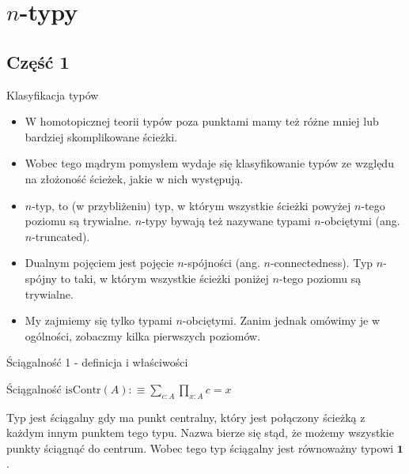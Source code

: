 \documentclass{beamer}
\newcommand{\defn}{:\equiv}
\newcommand{\isContr}{\text{isContr}}
\begin{document}
\section{$n$-typy}

\subsection{Część 1}

\begin{frame}{Klasyfikacja typów}
\begin{itemize}
	\item W homotopicznej teorii typów poza punktami mamy też różne mniej lub bardziej skomplikowane ścieżki.
	\item Wobec tego mądrym pomysłem wydaje się klasyfikowanie typów ze względu na złożoność ścieżek, jakie w nich występują.
	\item $n$-typ, to (w przybliżeniu) typ, w którym wszystkie ścieżki powyżej $n$-tego poziomu są trywialne. $n$-typy bywają też nazywane typami $n$-obciętymi (ang. $n$-truncated).
	\item Dualnym pojęciem jest pojęcie $n$-spójności (ang. $n$-connectedness). Typ $n$-spójny to taki, w którym wszystkie ścieżki poniżej $n$-tego poziomu są trywialne.
	\item My zajmiemy się tylko typami $n$-obciętymi. Zanim jednak omówimy je w ogólności, zobaczmy kilka pierwszych poziomów.
\end{itemize}
\end{frame}

\begin{frame}{Ściągalność 1 - definicja i właściwości}

\begin{block}{Ściągalność}
$
\displaystyle
\isContr(A) \defn \sum_{c : A} \prod_{x : A} c = x
$
\end{block}

Typ jest ściągalny gdy ma punkt centralny, który jest połączony ścieżką z każdym innym punktem tego typu. Nazwa bierze się stąd, że możemy wszystkie punkty ściągnąć do centrum. Wobec tego typ ściągalny jest równoważny typowi $\textbf{1}$.

\end{frame}
\end{document}
